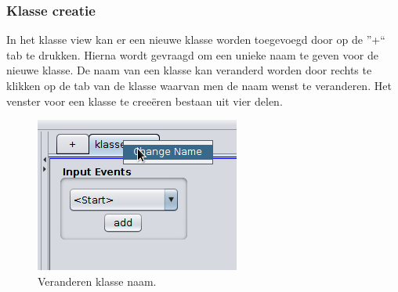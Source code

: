 \documentclass[]{article}
\begin{document}
\subsubsection{Klasse creatie}
In het klasse view kan er een nieuwe klasse worden toegevoegd door op de ''+`` tab te drukken. Hierna wordt gevraagd om een unieke naam te geven voor de nieuwe klasse. De naam van een klasse kan veranderd worden door rechts te klikken op de tab van de klasse waarvan men de naam wenst te veranderen. Het venster voor een klasse te cree\"{e}ren bestaan uit vier delen.
\begin{figure}[H]
  \centering
\includegraphics[scale=0.6]{Documentatie/images/changeclass}
  \caption{Veranderen klasse naam.} \label{KlasseView}
\end{figure}
\end{document}
